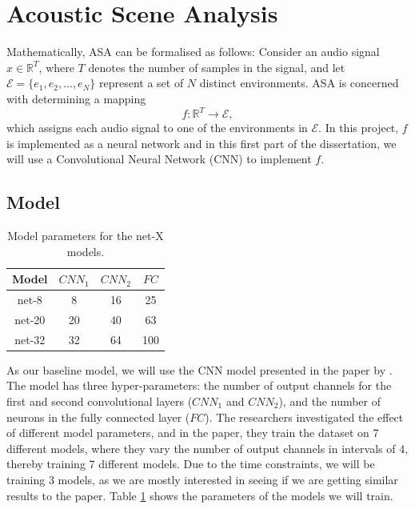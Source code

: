 \documentclass[logo,bsc,singlespacing,parskip,online]{infthesis}
\begin{document}
\section{Acoustic Scene Analysis}
\label{sec:methodology-asa}
Mathematically, ASA can be formalised as follows:
Consider an audio signal \(x \in \mathbb{R}^{T}\), where \(T\) denotes the number of samples in the signal, and let \(\mathcal{E} = \{e_1, e_2, \ldots, e_N\}\) represent a set of \(N\) distinct environments. ASA is concerned with determining a mapping 
\[
f: \mathbb{R}^{T} \rightarrow \mathcal{E},
\]
which assigns each audio signal to one of the environments in \(\mathcal{E}\). In this project, \(f\) is implemented as a neural network
and in this first part of the dissertation, we will use a Convolutional Neural Network (CNN) to implement \(f\).

\subsection{Model}
\label{sec:asa-model}
\begin{table}[h]
   \centering
   \begin{tabular}{|c|c|c|c|}
      \hline
      Model & $CNN_1$ & $CNN_2$ & $FC$ \\
      \hline
      net-8 & 8 & 16 & 25 \\
      net-20 & 20 & 40 & 63 \\
      net-32 & 32 & 64 & 100 \\
      \hline
   \end{tabular}
   \caption{Model parameters for the net-X models.}
   \label{tab:cnn-model-params}
\end{table}
As our baseline model, we will use the CNN model presented in the paper by \citet{Huwel2020HearDS}. 
The model has three hyper-parameters: the number of output channels for the first and second convolutional layers ($CNN_1$ and $CNN_2$),
and the number of neurons in the fully connected layer ($FC$). The researchers investigated the effect of different model parameters, 
and in the paper, they train the dataset on 7 different models, where they vary the number of output channels in intervals of 4, thereby training 7 different models.
Due to the time constraints, we will be training 3 models, as we are mostly interested in seeing if we are getting similar results to the paper.
Table \ref{tab:cnn-model-params} shows the parameters of the models we will train.
\end{document}
